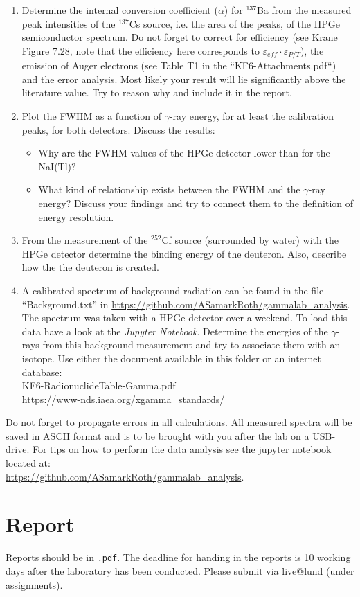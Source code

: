 \documentclass[12pt]{article}
\begin{document}
\begin{enumerate}
  \item Determine the internal conversion coefficient ($\alpha$) for $^{137}$Ba from the measured peak intensities of the $^{137}$Cs source, i.e. the area of the peaks, of the HPGe semiconductor spectrum. Do not forget to correct for efficiency (see Krane Figure 7.28, note that the efficiency here corresponds to $\varepsilon_{eff} \cdot \varepsilon_{P/T}$), the emission of Auger electrons (see Table T1 in the ``KF6-Attachments.pdf``) and the error analysis. Most likely your result will lie significantly above the literature value. Try to reason why and include it in the report.
  \item Plot the FWHM as a function of $\gamma$-ray energy, for at least the calibration peaks, for both detectors. Discuss the results:
    \begin{itemize}
      \item Why are the FWHM values of the HPGe detector lower than for the NaI(Tl)?
      \item What kind of relationship exists between the FWHM and the $\gamma$-ray energy? Discuss your findings and try to connect them to the definition of energy resolution.
    \end{itemize}
  \item From the measurement of the $^{252}$Cf source (surrounded by water) with the HPGe detector determine the binding energy of the deuteron. Also, describe how the the deuteron is created.
  \item A calibrated spectrum of background radiation can be found in the file ``Background.txt'' in \href{https://github.com/ASamarkRoth/gammalab\_analysis}{https://github.com/ASamarkRoth/gammalab\_analysis}. The spectrum was taken with a HPGe detector over a weekend. To load this data have a look at the {\it Jupyter Notebook}. Determine the energies of the $\gamma$-rays from this background measurement and try to associate them with an isotope. Use either the document available in this folder or an internet database: \\
    KF6-RadionuclideTable-Gamma.pdf \\
    https://www-nds.iaea.org/xgamma\_standards/
\end{enumerate}

\underline{Do not forget to propagate errors in all calculations.} All measured spectra will be saved in ASCII format and is to be brought with you after the lab on a USB-drive. For tips on how to perform the data analysis see the jupyter notebook located at: \\ \href{https://github.com/ASamarkRoth/gammalab\_analysis}{https://github.com/ASamarkRoth/gammalab\_analysis}.


\section*{Report}
Reports should be in \texttt{.pdf}. The deadline for handing in the reports is 10 working days after the laboratory has been conducted.
Please submit via live@lund (under assignments).
\end{document}
